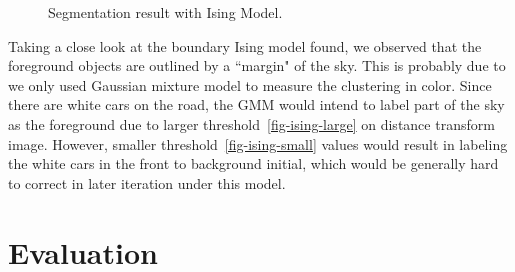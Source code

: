 \documentclass{article} %
\begin{document}
\begin{figure}[h]
\begin{center}
\end{center}
\caption{Segmentation result with Ising Model.}
\label{fig-ising-00_00}
\end{figure}

Taking a close look at the boundary Ising model found, we observed that the foreground objects are outlined by a ``margin" of the sky. This is probably due to we only used Gaussian mixture model to measure the clustering in color. Since there are white cars on the road, the GMM would intend to label part of the sky as the foreground due to larger threshold~\ref{fig-ising-large} on distance transform image. However, smaller threshold~\ref{fig-ising-small} values would result in labeling the white cars in the front to background initial, which would be generally hard to correct in later iteration under this model.

\section{Evaluation}
\end{document}
